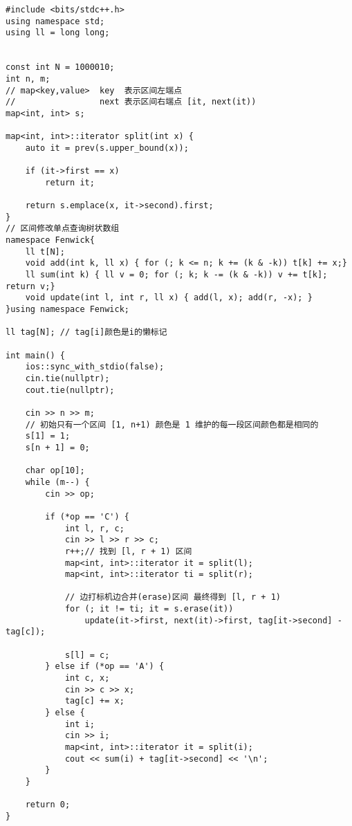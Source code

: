 \begin{verbatim}
#include <bits/stdc++.h>
using namespace std;
using ll = long long;


const int N = 1000010;
int n, m;
// map<key,value>  key  表示区间左端点
//                 next 表示区间右端点 [it, next(it))
map<int, int> s;

map<int, int>::iterator split(int x) {
    auto it = prev(s.upper_bound(x));

    if (it->first == x)
        return it;

    return s.emplace(x, it->second).first;
}
// 区间修改单点查询树状数组
namespace Fenwick{
    ll t[N];
    void add(int k, ll x) { for (; k <= n; k += (k & -k)) t[k] += x;}
    ll sum(int k) { ll v = 0; for (; k; k -= (k & -k)) v += t[k]; return v;}
    void update(int l, int r, ll x) { add(l, x); add(r, -x); }
}using namespace Fenwick;

ll tag[N]; // tag[i]颜色是i的懒标记

int main() {
    ios::sync_with_stdio(false);
    cin.tie(nullptr);
    cout.tie(nullptr);

    cin >> n >> m;
    // 初始只有一个区间 [1, n+1) 颜色是 1 维护的每一段区间颜色都是相同的
    s[1] = 1;
    s[n + 1] = 0;

    char op[10];
    while (m--) {
        cin >> op;

        if (*op == 'C') {
            int l, r, c;
            cin >> l >> r >> c;
            r++;// 找到 [l, r + 1) 区间
            map<int, int>::iterator it = split(l);
            map<int, int>::iterator ti = split(r);
            
            // 边打标机边合并(erase)区间 最终得到 [l, r + 1)
            for (; it != ti; it = s.erase(it)) 
                update(it->first, next(it)->first, tag[it->second] - tag[c]);
            
            s[l] = c; 
        } else if (*op == 'A') {
            int c, x;
            cin >> c >> x;
            tag[c] += x;
        } else {
            int i;
            cin >> i;
            map<int, int>::iterator it = split(i);
            cout << sum(i) + tag[it->second] << '\n';
        }
    }

    return 0;
}
\end{verbatim}